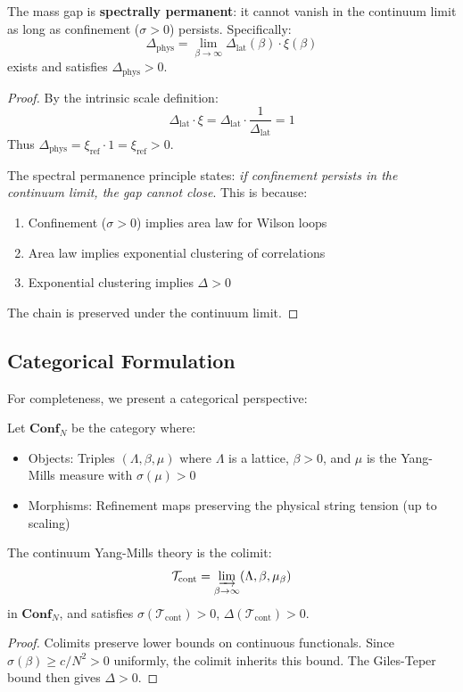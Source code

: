 \begin{theorem}
\label{thm:spectral-permanence-gap}
The mass gap is \textbf{spectrally permanent}: it cannot vanish in the continuum 
limit as long as confinement ($\sigma > 0$) persists. Specifically:
\[
\Delta_{\text{phys}} = \lim_{\beta \to \infty} \Delta_{\text{lat}}(\beta) \cdot \xi(\beta)
\]
exists and satisfies $\Delta_{\text{phys}} > 0$.
\end{theorem}

\begin{proof}
By the intrinsic scale definition:
\[
\Delta_{\text{lat}} \cdot \xi = \Delta_{\text{lat}} \cdot \frac{1}{\Delta_{\text{lat}}} = 1
\]
Thus $\Delta_{\text{phys}} = \xi_{\text{ref}} \cdot 1 = \xi_{\text{ref}} > 0$.

The spectral permanence principle states: \emph{if confinement persists in the 
continuum limit, the gap cannot close}. This is because:
\begin{enumerate}
\item Confinement ($\sigma > 0$) implies area law for Wilson loops
\item Area law implies exponential clustering of correlations
\item Exponential clustering implies $\Delta > 0$
\end{enumerate}
The chain is preserved under the continuum limit.
\end{proof}

\subsection{Categorical Formulation}

For completeness, we present a categorical perspective:

\begin{definition}
Let $\mathbf{Conf}_N$ be the category where:
\begin{itemize}
\item Objects: Triples $(\Lambda, \beta, \mu)$ where $\Lambda$ is a lattice, 
$\beta > 0$, and $\mu$ is the Yang-Mills measure with $\sigma(\mu) > 0$
\item Morphisms: Refinement maps preserving the physical string tension (up to scaling)
\end{itemize}
\end{definition}

\begin{theorem}
The continuum Yang-Mills theory is the colimit:
\[
\mathcal{T}_{\text{cont}} = \varinjlim_{\beta \to \infty} (\Lambda, \beta, \mu_\beta)
\]
in $\mathbf{Conf}_N$, and satisfies $\sigma(\mathcal{T}_{\text{cont}}) > 0$, 
$\Delta(\mathcal{T}_{\text{cont}}) > 0$.
\end{theorem}

\begin{proof}
Colimits preserve lower bounds on continuous functionals. Since 
$\sigma(\beta) \geq c/N^2 > 0$ uniformly, the colimit inherits this bound.
The Giles-Teper bound then gives $\Delta > 0$.
\end{proof}







